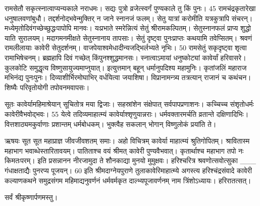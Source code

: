 रामसेतौ सकृत्स्नात्वाप्यन्यकाले नराधमः।
 सद्यः पुत्रो व्रजेत्स्वर्गं पुण्यकाले तु किं पुनः।
 45 रामचंद्रकृतारेखा धनुषालवणांबुधौ।
 तद्दर्शनोद्भवेन्मुक्तिर् न जाने स्नानजं फलम्।
 सेतु यात्रां करोमीति यत्रकुत्रापि संचरन्।
 मध्येमृतोदिवंगच्छेच्छुद्धःपापोपि मानवः।
 यःप्रभाते स्मरेन्नित्यं सेतुं श्रीरामकल्पितम्।
 सेतुस्नानफलं प्राप्य शुद्धो याति सुरालयम्।
 मदागमनमीक्षते सेतुस्नानाय तापसाः।
 सेतुं दृष्ट्वा पुनःप्राप्तः कथयामि तवेप्सितम्।
 श्रवणं रामलीलायाः कावेरी सेतुदर्शनम्।
 वाजपेयाश्वमेधादीन्यजद्भिर्लभ्यते नृभिः।
 50 रामसेतुं सकृदृष्ट्वा शृत्वा रामाभिषेचनम्।
 ब्रह्महापि दिवं गच्छेत् किंपुनश्शुद्धमानसः।
 स्नात्वाऽमायां धनुष्कोट्यां कावेर्यां हरिवासरे।
 कुलकोटि समुद्धृत्य विष्णुसायुज्यमाप्नुयात्।
 इत्युत्तमान् बहून् धर्मानुपदिश्य महामुनिः।
 कृतांजलिं महाराज मभिनंद्य पुनःपुनः।
 दिव्याशीर्भिरमोघाभिर् वर्धयित्वा जयाशिषा।
 विप्रानामन्त्र्य तत्रत्यान् राजानं च कथंचन।
 शिष्यैः परिवृतोयोगी तपोवनमवापसः।
 
सूतः
कावेर्यामहिमाश्रेयान् सूचितोत्र मया द्विजाः।
 सहस्रांशेन संक्षेपात् सर्वपापप्रणाशनः।
 कच्चिच्च संशृतोधर्मः कावेरीवैभवोद्भवः।
 55 येत्वे तदिव्यमाहात्म्यं कावेर्याश्शृणुयान्नराः।
 धर्मवक्तारमर्चति व्रतान्ते दक्षिणादिभिः।
 वित्तशाठ्यमकुर्वाणाः प्रशान्तम् धर्मबोधकम्।
 भुक्त्वैह सकलान् भोगान् विष्णुलोकं प्रयांति ते।
 
ऋषयः
सूत सूत महाप्राज्ञ जीवजीवशतम् समाः।
 अहो विचित्रम् कावेर्या माहात्म्यं श्रुतिगोपितम्।
 श्रावितास्म महाभाग भवाब्धेस्तारितावयम्।
 पातिताश्च वयं श्रीमत् कावेरी पुण्यवैभवात्।
 कृतार्थाश्च महाभाग तपो नः किमतःपरम्।
 इति प्रसन्नानन नीरजामुदा ते
शौनकाद्या मुनयो मुमुक्षवः।
 हरिश्चरित्र श्रवणोत्सवोत्सुका
___ गंधाक्षताद्यैः पुनरप्य पूजयन्।
 60 इति श्रीमदाग्नेयपुराणे तुलाकावेरिमाहात्म्ये अगस्त्य हरिश्चंद्रसंवादे कावेरी कल्याणकथने समुद्रसंगम महिमाद्यनुवर्णनं धर्मवर्मकृत दाल्भ्यपूजावर्णनम्
नाम त्रिंशोऽध्यायः।
 हरिरातत्सत्।
 
सर्वं श्रीकृष्णार्पणमस्तु।

